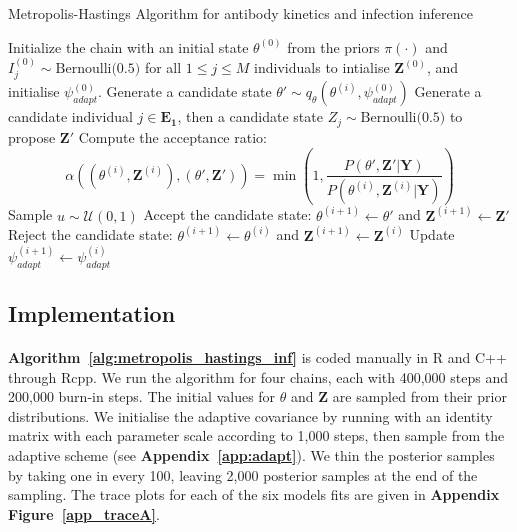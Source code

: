 \begin{algorithm}[H]
\caption{Metropolis-Hastings Algorithm for antibody kinetics and infection inference}
\label{alg:metropolis_hastings_inf}
\begin{algorithmic}[1]
    \State Initialize the chain with an initial state $\theta^{(0)}$ from the priors $\pi(\cdot)$ and $I^{(0)}_{j} \sim \text{Bernoulli(0.5)}$ for all $1 \leq j \leq M$ individuals to intialise $\mathbf{Z}^{(0)}$, and initialise $\psi^{(0)}_{adapt}$.
        \State Generate a candidate state $\theta' \sim q_\theta\left(\theta^{(i)}, \psi^{(0)}_{adapt}\right)$
        \State Generate a candidate individual $j \in \mathbf{E_1} $, then a candidate state $Z_j \sim \text{Bernoulli(0.5)}$ to propose $\mathbf{Z}'$
        \State Compute the acceptance ratio:
        \[
        \alpha((\theta^{(i)}, \mathbf{Z}^{(i)}),( \theta',  \mathbf{Z}')) = \min\left(1, \frac{P(\theta', \mathbf{Z}'|\mathbf{Y})}{P(\theta^{(i)}, \mathbf{Z}^{(i)}|\mathbf{Y})} \right)
        \]
        \State Sample $u \sim \mathcal{U}(0, 1)$
            \State Accept the candidate state: $\theta^{(i+1)} \leftarrow \theta'$ and $\mathbf{Z}^{(i + 1)}  \leftarrow \mathbf{Z}'$
        \Else
            \State Reject the candidate state: $\theta^{(i+1)} \leftarrow \theta^{(i)}$ and $\mathbf{Z}^{(i + 1)}  \leftarrow \mathbf{Z}^{(i)} $
        \EndIf 
        \State Update $ \psi^{(i + 1)}_{adapt} \leftarrow \psi^{(i)}_{adapt}$
    \EndFor
\end{algorithmic} 
\end{algorithm}


\subsection{Implementation }
\paragraph{}  \textbf{Algorithm~\ref{alg:metropolis_hastings_inf}} is coded manually in R and C++ through Rcpp. We run the algorithm for four chains, each with 400,000 steps and 200,000 burn-in steps. The initial values for $\theta$ and $\mathbf{Z}$ are sampled from their prior distributions. We initialise the adaptive covariance by running with an identity matrix with each parameter scale according to 1,000 steps, then sample from the adaptive scheme (see \textbf{Appendix~\ref{app:adapt}}). We thin the posterior samples by taking one in every 100, leaving 2,000 posterior samples at the end of the sampling. The trace plots for each of the six models fits are given in \textbf{Appendix Figure~\ref{app_traceA}}.

